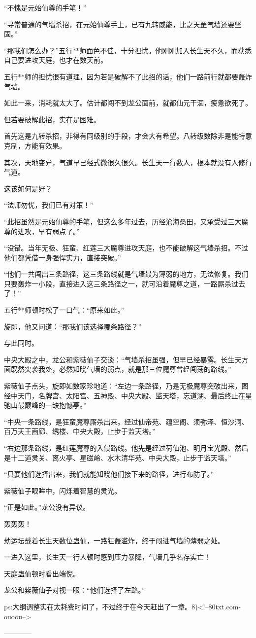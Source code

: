 \begin{this_body}
“不愧是元始仙尊的手笔！”

“寻常普通的气墙杀招，在元始仙尊手上，已有九转威能，比之天罡气墙还要坚固。”

“那我们怎么办？”五行**师面色不佳，十分担忧。他刚刚加入长生天不久，而获悉自己要进攻天庭，也才在数天前。

五行**师的担忧很有道理，因为若是破解不了此招的话，他们一路前行就都要轰炸气墙。

如此一来，消耗就太大了。估计都闯不到龙公面前，就都仙元干涸，疲惫欲死了。

但若要破解此招，实在是困难。

首先这是九转杀招，非得有同级别的手段，才会大有希望。八转级数除非是能特意克制，方能有效果。

其次，天地变异，气道早已经式微很久很久。长生天一行数人，根本就没有人修行气道。

这该如何是好？

“法师勿忧，我们已有对策！”

“此招虽然是元始仙尊的手笔，但这么多年过去，历经沧海桑田，又承受过三大魔尊的进攻，早有弱点了。”

“没错。当年无极、狂蛮、红莲三大魔尊进攻天庭，也不能破解这气墙杀招。不过他们都凭借一身强悍实力，直接突破。”

“他们一共闯出三条路径，这三条路线就是气墙最为薄弱的地方，无法修复。我们只要轰炸一小段，直接进入这三条路径之一，就可沿着魔尊之道，一路厮杀过去了！”

五行**师顿时松了一口气：“原来如此。”

旋即，他又问道：“那我们该选择哪条路径？”

与此同时。

中央大殿之中，龙公和紫薇仙子交谈：“气墙杀招虽强，但早已经暴露。长生天方面既然突袭我处，必然知晓气墙的弱点，就是那三位魔尊曾经闯荡的路线。”

紫薇仙子点头，旋即如数家珍地道：“左边一条路径，乃是无极魔尊突破出来，图经中天门，名牌宫、太阳宫、五神殿、中央大殿、监天塔，忘道湖、最后终止在星驰山最巅峰的一缺抱憾亭。”

“中央一条路线，是狂蛮魔尊厮杀出来。经过仙帝苑、蕴空阁、须弥泽、恒沙洞、百万天王画廊、绣楼、中央大殿，止步于监天塔。”

“右边那条路线，是红莲魔尊的入侵路线。他先是经过荷仙池、明月宝光殿、然后是十二道灵关、离火亭、星磁岭、水木清华苑、中央大殿，止步于监天塔。”

“只要他们选择出来，我们就能知晓他们接下来的路径，进行布防了。”

紫薇仙子眼眸中，闪烁着智慧的灵光。

“正是如此。”龙公没有异议。

轰轰轰！

劫运坛载着长生天数位蛊仙，一路狂轰滥炸，终于闯进气墙的薄弱之处。

一进入这里，长生天一行人顿时感到压力暴降，气墙几乎名存实亡！

天庭蛊仙顿时看出端倪。

龙公和紫薇仙子对视一眼：“他们选择了左路。”

ps:大纲调整实在太耗费时间了，不过终于在今天赶出了一章。8)<!--80txt.com-ouoou-->

------------

\end{this_body}

